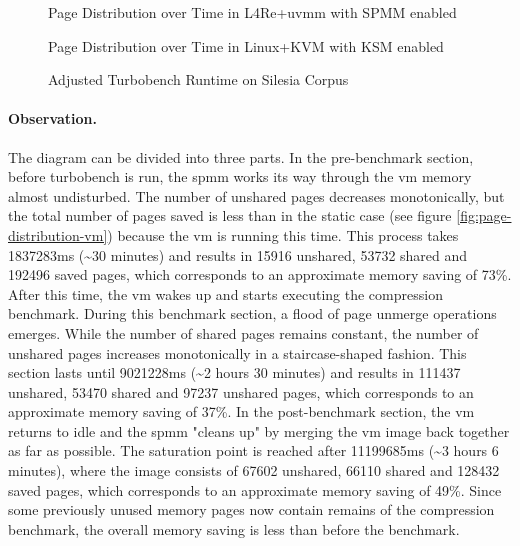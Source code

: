 \begin{figure}
  \centering
  
  \caption{Page Distribution over Time in L4Re+uvmm with SPMM enabled}
  \label{fig:page-distribution-turbobench-silesia}
  \centering
  
  \caption{Page Distribution over Time in Linux+KVM with KSM enabled}
  \label{fig:page-distribution-ksm-turbobench-silesia}
  \centering
  
  \caption{Adjusted Turbobench Runtime on Silesia Corpus}
  \label{fig:runtime-turbobench-silesia}
\end{figure}

\paragraph{Observation.}

The diagram can be divided into three parts.
In the pre-benchmark section, before turbobench is run, the \ac{spmm} works its way through the \ac{vm} memory almost undisturbed.
The number of unshared pages decreases monotonically, but the total number of pages saved is less than in the static case (see figure \ref{fig:page-distribution-vm}) because the \ac{vm} is running this time.
This process takes 1837283ms (\textasciitilde{}30 minutes) and results in 15916 unshared, 53732 shared and 192496 saved pages, which corresponds to an approximate memory saving of 73\%.
After this time, the \ac{vm} wakes up and starts executing the compression benchmark.
During this benchmark section, a flood of page unmerge operations emerges.
While the number of shared pages remains constant, the number of unshared pages increases monotonically in a staircase-shaped fashion.
This section lasts until 9021228ms (\textasciitilde{}2 hours 30 minutes) and results in 111437 unshared, 53470 shared and 97237 unshared pages, which corresponds to an approximate memory saving of 37\%.
In the post-benchmark section, the \ac{vm} returns to idle and the \ac{spmm} "cleans up" by merging the \ac{vm} image back together as far as possible.
The saturation point is reached after 11199685ms (\textasciitilde{}3 hours 6 minutes), where the image consists of 67602 unshared, 66110 shared and 128432 saved pages, which corresponds to an approximate memory saving of 49\%.
Since some previously unused memory pages now contain remains of the compression benchmark, the overall memory saving is less than before the benchmark.

